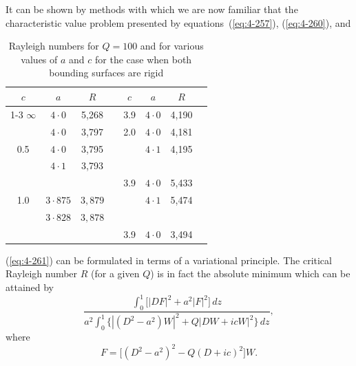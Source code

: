 It can be shown by methods with which we are now familiar that the characteristic value problem presented by equations~(\ref{eq:4-257}), (\ref{eq:4-260}), and

\begin{table}[t]
\centering
\caption{Rayleigh numbers for $Q=100$ and for various values of $a$ and $c$ for the case when both bounding surfaces are rigid}
\label{tab:XVII}
\smallskip
\begin{tabular}{cccccccc}
\hline
$c$ & $a$ & $R$ & & $c$ & $a$ & $R$ \\
\cline{1-3} \cline{5-7}
$\infty$ & $4{\cdot}0$ & 5{,}268 & & 3.9 & $4{\cdot}0$ & 4{,}190 \\
& $4{\cdot}0$ & 3{,}797 & & 2.0 & $4{\cdot}0$ & 4{,}181 \\
0.5 & $4{\cdot}0$ & 3{,}795 & & & $4{\cdot}1$ & 4{,}195 \\
& $4{\cdot}1$ & 3{,}793 & & & & \\
& & & & 3.9 & $4{\cdot}0$ & 5{,}433 \\
1.0 & $3{\cdot}875$ & $3{,}879$ & & & $4{\cdot}1$ & 5{,}474 \\
& $3{\cdot}828$ & $3{,}878$ & & & & \\
& & & & 3.9 & $4{\cdot}0$ & 3{,}494 \\
\hline
\end{tabular}
\end{table}
%
(\ref{eq:4-261}) can be formulated in terms of a variational principle. The critical Rayleigh number $R$ (for a given $Q$) is in fact the absolute minimum which can be attained by
\begin{equation}
\label{eq:4-262}
\frac{\displaystyle\int_0^1 \bigl[|DF|^2+a^2|F|^2\bigr]\,dz}{a^2\displaystyle\int_0^1\bigl\{|(D^2-a^2)W|^2+Q|DW+icW|^2\bigr\}\,dz},
\end{equation}
where
\begin{equation}
\label{eq:4-263}
F = \bigl[(D^2-a^2)^2-Q(D+ic)^2\bigr]W.
\end{equation}

